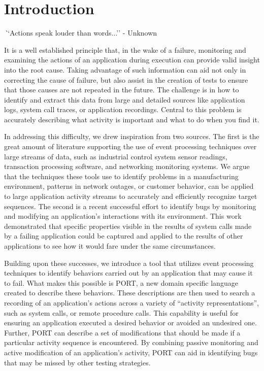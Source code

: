 \section{Introduction}
\label{SEC:introduction}


{\textit ``Actions speak louder than words...'' - Unknown}


It is a well established principle
that, in the wake of a failure,
monitoring and examining the actions
of an application
during execution can provide valid insight
into the root cause.
Taking advantage of such information
can aid not only in correcting
the cause of failure,
but also assist in the creation
of tests to ensure
that those causes
are not repeated in the future.
The challenge is in
how to identify and extract this data
from large and detailed sources like application logs,
system call traces,
or application recordings.
Central to this problem
is accurately describing what activity is important
and what to do when you find it.

In addressing this difficulty,
we drew inspiration from two sources.
The first is
the great amount of literature
supporting the use of event
processing techniques over large streams of data, such as
industrial control system sensor readings,
transaction processing software,
and networking monitoring systems.
We argue that the techniques these tools use
to identify problems in a manufacturing environment,
patterns in network outages,
or customer behavior,
can be applied
to large application activity streams to accurately
and efficiently recognize target sequences.
The second is a recent successful effort
to identify bugs by monitoring
and modifying an application's interactions with its environment.
This work demonstrated that specific properties
visible in the results of system calls
made by a failing application
could be captured and applied
to the results of other applications
to see how it would fare under the same circumstances.

Building upon these successes,
we introduce a tool
that utilizes event processing techniques
to identify
behaviors carried out by an application
that may cause it to fail.
What makes this possible is PORT,
a new domain specific language
created to describe these behaviors.
These descriptions are then used
to search a recording of an application's actions
across a variety of ``activity representations'',
such as system calls,
or remote procedure calls.
This capability is useful
for ensuring an application executed a desired behavior
or avoided an undesired one.
Further, PORT can describe
a set of modifications
that should be made
if a particular activity sequence is encountered.
By combining passive monitoring and active modification
of an application's activity,
PORT can aid in identifying bugs
that may be missed by other testing strategies.

